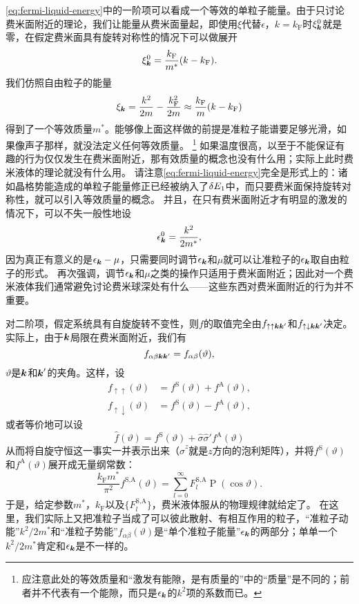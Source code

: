 \documentclass[hyperref, UTF8, a4paper]{ctexart}
\DeclareMathOperator{\legpoly}{P}
\begin{document}
\eqref{eq:fermi-liquid-energy}中的一阶项可以看成一个等效的单粒子能量。由于只讨论费米面附近的理论，我们让能量从费米面量起，即使用$\xi$代替$\epsilon$，$k=k_\text{F}$时$\xi^0_{\vb*{k}}$就是零，在假定费米面具有旋转对称性的情况下可以做展开
\[
    \xi^0_{\vb*{k}} = \frac{k_\text{F}}{m^*} (k - k_\text{F}).
\]
我们仿照自由粒子的能量
\[
    \xi_{\vb*{k}} = \frac{k^2}{2m} - \frac{k_\text{F}^2}{2m} \approx \frac{k_\text{F}}{m} (k - k_\text{F})
\]
得到了一个等效质量$m^*$。能够像上面这样做的前提是准粒子能谱要足够光滑，如果像声子那样，就没法定义任何等效质量。%
\footnote{应注意此处的等效质量和“激发有能隙，是有质量的”中的“质量”是不同的；前者并不代表有一个能隙，而只是$\epsilon_{\vb*{k}}$的$k^2$项的系数而已。}%
如果温度很高，以至于不能保证有趣的行为仅仅发生在费米面附近，那有效质量的概念也没有什么用；实际上此时费米液体的理论就没有什么用。
请注意\eqref{eq:fermi-liquid-energy}完全是形式上的：诸如晶格势能造成的单粒子能量修正已经被纳入了$\var{E_1}$中，而只要费米面保持旋转对称性，就可以引入等效质量的概念。
并且，在只有费米面附近才有明显的激发的情况下，可以不失一般性地设
\[
    \epsilon_{\vb*{k}}^0 = \frac{k^2}{2m^*},
\]
因为真正有意义的是$\epsilon_{\vb*{k}} - \mu$，只需要同时调节$\epsilon_{\vb*{k}}$和$\mu$就可以让准粒子的$\epsilon_{\vb*{k}}$取自由粒子的形式。
再次强调，调节$\epsilon_{\vb*{k}}$和$\mu$之类的操作只适用于费米面附近；因此对一个费米液体我们通常避免讨论费米球深处有什么——这些东西对费米面附近的行为并不重要。

对二阶项，假定系统具有自旋旋转不变性，则$f$的取值完全由$f_{\uparrow \uparrow \vb*{k} \vb*{k}'}$和$f_{\uparrow \downarrow \vb*{k} \vb*{k}'}$决定。
实际上，由于$\vb*{k}$局限在费米面附近，我们有
\[
    f_{\alpha \beta \vb*{k} \vb*{k}'} = f_{\alpha \beta}(\vartheta),
\]
$\vartheta$是$\vb*{k}$和$\vb*{k}'$的夹角。这样，设
\begin{equation}
    \begin{aligned}
        f_{\uparrow \uparrow}(\vartheta) &= f^\text{S}(\vartheta) + f^\text{A}(\vartheta), \\
        f_{\uparrow \downarrow}(\vartheta) &= f^\text{S}(\vartheta) - f^\text{A}(\vartheta),
    \end{aligned}
\end{equation}
或者等价地可以设
\begin{equation}
    \hat{f}(\vartheta) = f^\text{S}(\vartheta) + \hat{\sigma} \hat{\sigma}' f^\text{A}(\vartheta)
\end{equation}
从而将自旋守恒这一事实一并表示出来（$\hat{\sigma}^z$就是$z$方向的泡利矩阵），并将$f^\text{S}(\vartheta)$和$f^\text{A}(\vartheta)$展开成无量纲常数：
\begin{equation}
    \frac{k_\text{F} m^*}{\pi^2} f^\text{S,A}(\vartheta) = \sum_{l=0}^\infty F_l^\text{S,A} \legpoly (\cos \vartheta).
\end{equation}
于是，给定参数$m^*$，$k_\text{F}$以及$\{F_l^\text{S,A}\}$，费米液体服从的物理规律就给定了。
在这里，我们实际上又把准粒子当成了可以彼此散射、有相互作用的粒子，“准粒子动能”$k^2/2m^*$和“准粒子势能”$f_{\alpha \beta}(\vartheta)$是“单个准粒子能量”$\epsilon_{\vb*{k}}$的两部分；单单一个$k^2/2m^*$肯定和$\epsilon_{\vb*{k}}$是不一样的。
\end{document}
